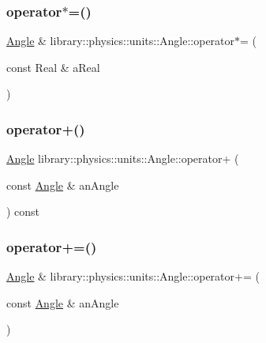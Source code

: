 \mbox{\label{classlibrary_1_1physics_1_1units_1_1_angle_af14d361f18244d859a3829c40aba6a14}} 
\subsubsection{\texorpdfstring{operator$\ast$=()}{operator*=()}}
{\footnotesize\ttfamily \hyperlink{classlibrary_1_1physics_1_1units_1_1_angle}{Angle} \& library\+::physics\+::units\+::\+Angle\+::operator$\ast$= (\begin{DoxyParamCaption}\item[{const Real \&}]{a\+Real }\end{DoxyParamCaption})}

\mbox{\label{classlibrary_1_1physics_1_1units_1_1_angle_aebf6869b414e02af92a924d561822824}} 
\subsubsection{\texorpdfstring{operator+()}{operator+()}}
{\footnotesize\ttfamily \hyperlink{classlibrary_1_1physics_1_1units_1_1_angle}{Angle} library\+::physics\+::units\+::\+Angle\+::operator+ (\begin{DoxyParamCaption}\item[{const \hyperlink{classlibrary_1_1physics_1_1units_1_1_angle}{Angle} \&}]{an\+Angle }\end{DoxyParamCaption}) const}

\mbox{\label{classlibrary_1_1physics_1_1units_1_1_angle_a5f20b012cb332e631a6271144a0817a2}} 
\subsubsection{\texorpdfstring{operator+=()}{operator+=()}}
{\footnotesize\ttfamily \hyperlink{classlibrary_1_1physics_1_1units_1_1_angle}{Angle} \& library\+::physics\+::units\+::\+Angle\+::operator+= (\begin{DoxyParamCaption}\item[{const \hyperlink{classlibrary_1_1physics_1_1units_1_1_angle}{Angle} \&}]{an\+Angle }\end{DoxyParamCaption})}

